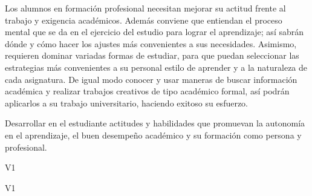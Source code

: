 \begin{syllabus}


\begin{justification}
Los alumnos en formación profesional necesitan mejorar su actitud frente al trabajo y exigencia académicos. Además conviene que entiendan el proceso mental que se da en el ejercicio del estudio para lograr el aprendizaje; así  sabrán dónde y cómo hacer los ajustes más convenientes a sus necesidades. Asimismo, requieren dominar variadas formas de estudiar, para que puedan seleccionar las estrategias  más convenientes a su personal estilo de aprender y a la naturaleza de cada asignatura. De igual modo conocer y usar  maneras de buscar información académica y realizar trabajos creativos de tipo académico formal, así podrán  aplicarlos a su trabajo universitario, haciendo exitoso su esfuerzo.
\end{justification}

\begin{goals}
\item Desarrollar en el estudiante actitudes y habilidades que promuevan la autonomía en el aprendizaje, el buen desempeño académico y su formación como persona y profesional.
\end{goals}

\begin{outcomes}{V1}
    \item {}
    \item {}
    \item {}
\end{outcomes}

\begin{competences}{V1}
    \item {}
    \item {}
\end{competences}


\end{syllabus}

